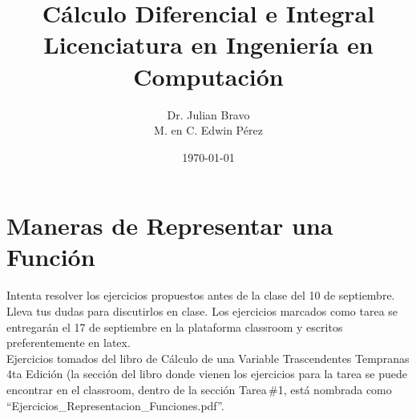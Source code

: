 \documentclass[12pt,tikz,border=5pt]{article}
\title{Cálculo Diferencial e Integral \\ Licenciatura en Ingeniería en Computación}
\author{Dr. Julian Bravo \\ M. en C. Edwin Pérez}
\date{\today}
\begin{document}
\maketitle

\section{Maneras de Representar una Función}
Intenta resolver los ejercicios propuestos antes de la clase del 10 de septiembre. Lleva tus dudas para discutirlos en clase. Los ejercicios marcados como tarea se entregarán el 17 de septiembre en la plataforma classroom y escritos preferentemente en latex. \\

Ejercicios tomados del libro de Cálculo de una Variable Trascendentes Tempranas 4ta Edición\citep{stewart2001calculo} (la sección del libro donde vienen los ejercicios para la tarea se puede encontrar en el classroom, dentro de la sección Tarea\,\#1, está nombrada como ``Ejercicios\_Representacion\_Funciones.pdf''.
\end{document}
